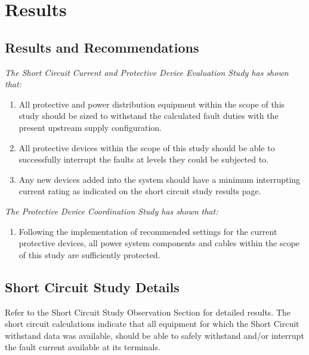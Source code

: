 
\section{Results}
\label{af:results}

\subsection{Results and Recommendations}
\label{af:results:afrr}

\noindent\emph{The Short Circuit Current and Protective Device Evaluation Study has shown that:}
\begin{enumerate}
	\item All protective and power distribution equipment within the scope of this study should be sized to withstand the calculated fault duties with the present upstream supply configuration.

	\item All protective devices within the scope of this study should be able to successfully interrupt the faults at levels they could be subjected to.

	\item Any new devices added into the system should have a minimum interrupting current rating as indicated on the short circuit study results page.
\end{enumerate}

\noindent\emph{The Protective Device Coordination Study has shown that:}
\begin{enumerate}
	\item Following the implementation of recommended settings for the current protective devices, all power system components and cables within the scope of this study are sufficiently protected.
\end{enumerate}

\subsection{Short Circuit Study Details}
\label{af:results:sccd}

\noindent Refer to the Short Circuit Study Observation Section for detailed results.  The short circuit calculations indicate that all equipment for which the Short Circuit withstand data was available, should be able to safely withstand and/or interrupt the fault current available at its terminals.

